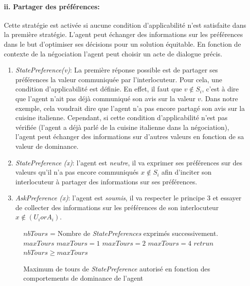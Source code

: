 			
		\paragraph{ii. Partager des préférences:} Cette stratégie est activée si aucune condition d'applicabilité n'est satisfaite dans la première stratégie. 
		L'agent peut échanger des informations sur les préférences dans le but d'optimiser ses décisions pour un solution équitable. En fonction de contexte de la négociation l'agent peut choisir un acte de dialogue précis.
			\begin{enumerate}
				\item \emph{StatePreference(v)}: La première réponse possible est de partager ses préférences la valeur communiquée par l'interlocuteur. Pour cela, une condition d'applicabilité est définie. En effet, il faut que $v \notin S_i$, c'est à dire que l'agent n'ait pas déjà communiqué son avis sur la valeur $v$. Dans notre exemple, cela voudrait dire que l'agent n'a pas encore partagé son avis sur la cuisine italienne.
				Cependant, si cette condition d'applicabilité n'est pas vérifiée (l'agent a déjà parlé de la cuisine italienne dans la négociation), l'agent peut échanger des informations sur d'autres valeurs en fonction de sa valeur de dominance. 
				
				\item \emph{StatePreference (x)}: l'agent est \emph{neutre}, il va exprimer ses préférences sur des valeurs qu'il n'a pas encore communiqués $x \notin S_i$ afin d'inciter son interlocuteur à partager des informations sur ses préférences.
				\item \emph{AskPreference (x)}: l'agent est \emph{soumis}, il va respecter le principe 3 et essayer de collecter des informations sur les préférences de son interlocuteur $x \not \in (U_i or A_i)$.
			\end{enumerate}  
	
	\begin{figure}[t]
		\caption{\label{alg:maxtours} Maximum de tours de \emph{StatePreference} autorisé en fonction des comportements de dominance de l'agent}
		\begin{algorithmic}[1]
			\State $nbTours$ = Nombre de \emph{StatePreferences} exprimés successivement.
			\State $maxTours$ 
			\State $maxTours = 1$
			\EndIf
			 \State $maxTours = 2$
			\EndIf
			\State $maxTours = 4$
			\EndIf
			\State $retrun$ $nbTours\geq maxTours$
			\EndFunction
		\end{algorithmic}
	\end{figure} 
	

